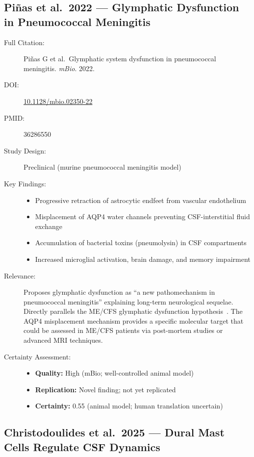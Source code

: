 \subsection{Pi\~{n}as et al.\ 2022 --- Glymphatic Dysfunction in Pneumococcal Meningitis}

\begin{description}
    \item[Full Citation:] Pi\~{n}as G et al.\ Glymphatic system dysfunction in pneumococcal meningitis. \textit{mBio}. 2022.
    \item[DOI:] \href{https://doi.org/10.1128/mbio.02350-22}{10.1128/mbio.02350-22}
    \item[PMID:] 36286550
    \item[Study Design:] Preclinical (murine pneumococcal meningitis model)
    \item[Key Findings:]
    \begin{itemize}
        \item Progressive retraction of astrocytic endfeet from vascular endothelium
        \item Misplacement of AQP4 water channels preventing CSF-interstitial fluid exchange
        \item Accumulation of bacterial toxins (pneumolysin) in CSF compartments
        \item Increased microglial activation, brain damage, and memory impairment
    \end{itemize}
    \item[Relevance:] Proposes glymphatic dysfunction as ``a new pathomechanism in pneumococcal meningitis'' explaining long-term neurological sequelae. Directly parallels the ME/CFS glymphatic dysfunction hypothesis~\cite{Perrin2025glymphatic}. The AQP4 misplacement mechanism provides a specific molecular target that could be assessed in ME/CFS patients via post-mortem studies or advanced MRI techniques.
    \item[Certainty Assessment:]
    \begin{itemize}
        \item \textbf{Quality:} High (mBio; well-controlled animal model)
        \item \textbf{Replication:} Novel finding; not yet replicated
        \item \textbf{Certainty:} 0.55 (animal model; human translation uncertain)
    \end{itemize}
\end{description}

\subsection{Christodoulides et al.\ 2025 --- Dural Mast Cells Regulate CSF Dynamics}

